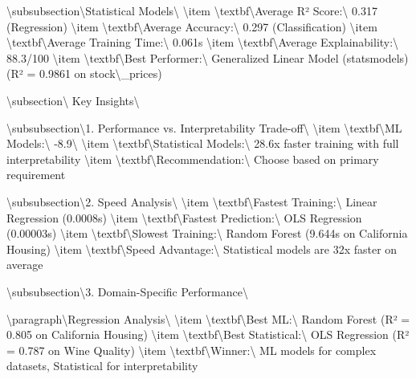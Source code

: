 \documentclass[11pt,a4paper]{article}
\begin{document}
\textbackslash{}subsubsection\textbackslash{}{Statistical Models\textbackslash{}}
\textbackslash{}item \textbackslash{}textbf\textbackslash{}{Average R² Score:\textbackslash{}} 0.317 (Regression)
\textbackslash{}item \textbackslash{}textbf\textbackslash{}{Average Accuracy:\textbackslash{}} 0.297 (Classification)
\textbackslash{}item \textbackslash{}textbf\textbackslash{}{Average Training Time:\textbackslash{}} 0.061s
\textbackslash{}item \textbackslash{}textbf\textbackslash{}{Average Explainability:\textbackslash{}} 88.3/100
\textbackslash{}item \textbackslash{}textbf\textbackslash{}{Best Performer:\textbackslash{}} Generalized Linear Model (statsmodels) (R² = 0.9861 on stock\textbackslash{}_prices)

\textbackslash{}subsection\textbackslash{}{ Key Insights\textbackslash{}}

\textbackslash{}subsubsection\textbackslash{}{1. Performance vs. Interpretability Trade-off\textbackslash{}}
\textbackslash{}item \textbackslash{}textbf\textbackslash{}{ML Models:\textbackslash{}} -8.9\textbackslash{}%
\textbackslash{}item \textbackslash{}textbf\textbackslash{}{Statistical Models:\textbackslash{}} 28.6x faster training with full interpretability
\textbackslash{}item \textbackslash{}textbf\textbackslash{}{Recommendation:\textbackslash{}} Choose based on primary requirement

\textbackslash{}subsubsection\textbackslash{}{2. Speed Analysis\textbackslash{}}
\textbackslash{}item \textbackslash{}textbf\textbackslash{}{Fastest Training:\textbackslash{}} Linear Regression (0.0008s)
\textbackslash{}item \textbackslash{}textbf\textbackslash{}{Fastest Prediction:\textbackslash{}} OLS Regression (0.00003s)
\textbackslash{}item \textbackslash{}textbf\textbackslash{}{Slowest Training:\textbackslash{}} Random Forest (9.644s on California Housing)
\textbackslash{}item \textbackslash{}textbf\textbackslash{}{Speed Advantage:\textbackslash{}} Statistical models are 32x faster on average

\textbackslash{}subsubsection\textbackslash{}{3. Domain-Specific Performance\textbackslash{}}

\textbackslash{}paragraph\textbackslash{}{Regression Analysis\textbackslash{}}
\textbackslash{}item \textbackslash{}textbf\textbackslash{}{Best ML:\textbackslash{}} Random Forest (R² = 0.805 on California Housing)
\textbackslash{}item \textbackslash{}textbf\textbackslash{}{Best Statistical:\textbackslash{}} OLS Regression (R² = 0.787 on Wine Quality)
\textbackslash{}item \textbackslash{}textbf\textbackslash{}{Winner:\textbackslash{}} ML models for complex datasets, Statistical for interpretability
\end{document}
